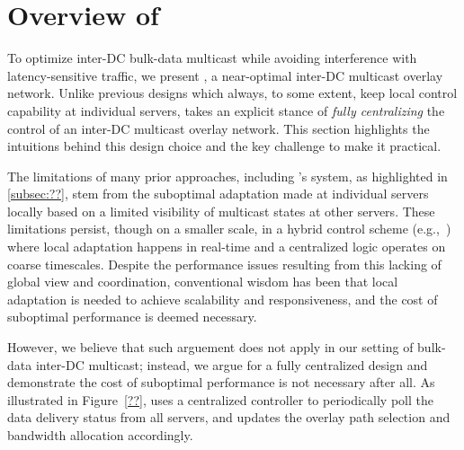 \section{Overview of \name}
\label{sec:overview}

To optimize inter-DC bulk-data multicast while avoiding
interference with latency-sensitive traffic, we present \name,
a near-optimal inter-DC multicast overlay network.
Unlike previous designs which always, to some extent, keep 
local control capability at individual servers,
\name takes an explicit stance of {\em fully centralizing} the 
control of an inter-DC multicast overlay network. 
This section highlights the intuitions behind this design 
choice and the key challenge to make it practical.







The limitations of many prior approaches, including \company's 
system, as highlighted in \Section\ref{subsec:??},
stem from the suboptimal adaptation made at individual servers 
locally based on a limited visibility of multicast states at
other servers. 
These limitations persist, though on a smaller scale, in a hybrid
control scheme (e.g.,~\cite{vdn}) where local 
adaptation happens in real-time and a centralized logic
operates on coarse timescales.
Despite the performance issues resulting from this
lacking of global view and coordination, conventional wisdom has 
been that local adaptation is needed to achieve 
scalability and responsiveness, and the cost of suboptimal 
performance is deemed necessary.


However, we believe that such arguement does not apply in our 
setting of bulk-data inter-DC multicast; instead, we argue for 
a fully centralized design and demonstrate the cost of
suboptimal performance is not necessary after all.
As illustrated in Figure~\ref{??}, 
\name uses a centralized controller to periodically poll
the data delivery status from all servers, and
updates the overlay path selection and bandwidth allocation
accordingly.

